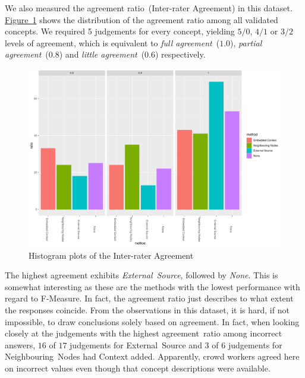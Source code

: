 We also measured the agreement ratio~(Inter-rater Agreement) in this dataset. \hyperref[fig:hist_agreement_climate_change_all]{Figure~\ref*{fig:hist_agreement_climate_change_all}} shows the distribution of the agreement ratio among all validated concepts. We required 5 judgements for every concept, yielding $5/0$, $4/1$ or $3/2$ levels of agreement, which is equivalent to
\emph{full agreement}~($1.0$), \emph{partial agreement}~($0.8$) and \emph{little agreement}~($0.6$) respectively. 
\begin{figure}
  	 \includegraphics[width=\textwidth]{plots/climate_change/hist_agreement}
  	 \caption{Histogram plots of the Inter-rater Agreement}\label{fig:hist_agreement_climate_change_all}
\end{figure}

The highest agreement exhibits \emph{External~Source}, followed by \emph{None}. This is somewhat interesting as these are the methods with the lowest performance with regard to F-Measure. In fact, the agreement ratio just describes to what extent the responses coincide. From the observations in this dataset, it is hard, if not impossible, to draw conclusions solely based on agreement. In fact, when looking closely at the judgements with the highest agreement~ratio among incorrect answers, $16$ of $17$ judgements for External~Source and $3$ of $6$ judgements for Neighbouring~Nodes had Context added. Apparently, crowd workers agreed here on incorrect values even though that concept descriptions were available. 

